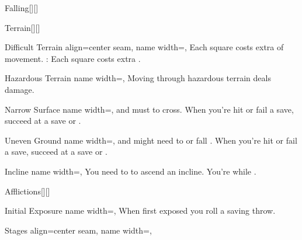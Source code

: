 \begin{PageBack}
\begin{Tables}{\backTableHeight}
\begin{Table}{Falling}[][]
        \end{Table}\TableSpace
        \begin{Table}{Terrain}[][]
            \begin{entry}{Difficult Terrain}{%
                align=center seam,
                name width=\turnLength,}
                Each square costs  extra \Feet of movement. \hfill
                {\textbf{}}: Each square costs  extra \Feet. \\\hfill
            \end{entry}
            \begin{entry}{Hazardous Terrain}{%
                name width=\turnLength,}
                Moving through hazardous terrain deals damage.
            \end{entry}
            \begin{entry}{Narrow Surface}{%
                name width=\turnLength,}
                \OffGuard and must  to cross. When you're hit or fail a save, succeed at a \ReflexT save or .
            \end{entry}
            \begin{entry}{Uneven Ground}{%
                name width=\turnLength,}
                \OffGuard and might need to  or fall \Prone. When you're hit or fail a save, succeed at a \ReflexT save or .
            \end{entry}
            \begin{entry}{Incline}{%
                name width=\turnLength,}
                You need to  to ascend an incline. You're \OffGuard while .
            \end{entry}
        \end{Table}\TableSpace
        \begin{Table}{Afflictions}[][]
            \begin{entry}{Initial Exposure}{%
                name width=\turnLength,%
            }
                When first exposed you roll a saving throw.   \hfill
            \end{entry}
            \begin{entry}{Stages}{%
                align=center seam,
                name width=\turnLength,}

\end{entry}
\end{Table}
\end{Tables}
\end{PageBack}
